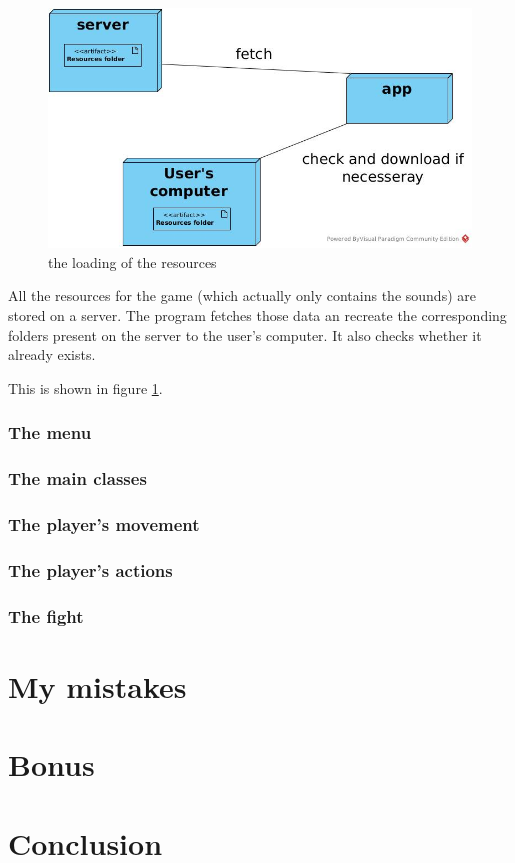 \documentclass[11pt]{extarticle}
\begin{document}
\begin{figure}[t]
    \centering
    
    \caption{the loading of the resources}
    \label{resources}
    \includegraphics[scale = 0.46]{resources}
\end{figure}

All the resources for the game (which actually only contains the sounds) are stored on a server. The program fetches those data an recreate the corresponding folders present on the server to the user's computer. It also checks whether it already exists. 

This is shown in figure \ref{resources}.

\section{The menu}

\section{The main classes}

\section{The player's movement}

\section{The player's actions}

\section{The fight}

\part{My mistakes}

\part{Bonus}

\part{Conclusion}
\end{document}
